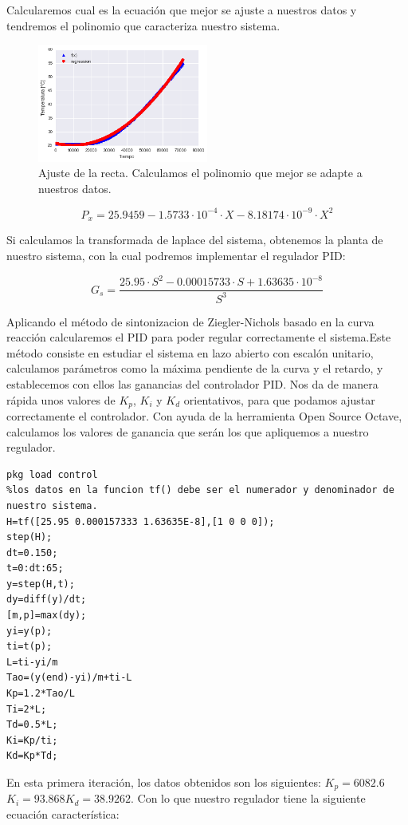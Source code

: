 Calcularemos cual es la ecuación que mejor se ajuste a nuestros datos y tendremos el polinomio que caracteriza nuestro sistema.

\begin{figure}[H]
    \centering
    \includegraphics[width=0.5\textwidth]{images/PLC/modelado/modelado_13_1.png}
    \caption[Ajuste de la recta.]{Ajuste de la recta. Calculamos el polinomio que mejor se adapte a nuestros datos.}
    \label{fig:plc_lazo_abierto2}
\end{figure}
$$P_x=  25.9459 -1.5733 \cdot 10^{-4} \cdot X - 8.18174 \cdot 10^{-9} \cdot X^2$$

Si calculamos la transformada de laplace del sistema, obtenemos la planta de nuestro sistema, con la cual podremos implementar el regulador PID:

$$G_s = \frac{25.95 \cdot S^2 - 0.00015733 \cdot S + 1.63635 \cdot 10^{-8}}{S^3}$$

Aplicando el método de sintonizacion de Ziegler-Nichols basado en la curva reacción calcularemos el PID para poder regular correctamente el sistema.Este método consiste en estudiar el sistema en lazo abierto con escalón unitario, calculamos parámetros como la máxima pendiente de la curva y el retardo, y establecemos con ellos las ganancias del controlador PID\cite{PID}. Nos da de manera rápida unos valores de $K_p$, $K_i$ y $K_d$ orientativos, para que podamos ajustar correctamente el controlador. Con ayuda de la herramienta Open Source Octave, calculamos los valores de ganancia que serán los que apliquemos a nuestro regulador.

\Cpp
\begin{lstlisting}
pkg load control
%los datos en la funcion tf() debe ser el numerador y denominador de nuestro sistema.
H=tf([25.95 0.000157333 1.63635E-8],[1 0 0 0]);
step(H);
dt=0.150;
t=0:dt:65;
y=step(H,t);
dy=diff(y)/dt;
[m,p]=max(dy);
yi=y(p);
ti=t(p);
L=ti-yi/m
Tao=(y(end)-yi)/m+ti-L
Kp=1.2*Tao/L
Ti=2*L;
Td=0.5*L;
Ki=Kp/ti;
Kd=Kp*Td;
\end{lstlisting}

En esta primera iteración, los datos obtenidos son los siguientes: $K_p = 6082.6$ $K_i=93.868 K_d=38.9262$. Con lo que nuestro regulador tiene la siguiente ecuación característica:

